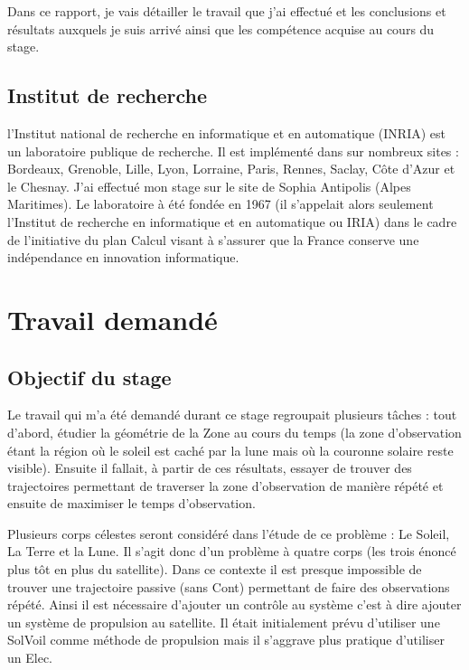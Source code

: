 \documentclass[12pt]{article} %
\begin{document}
		Dans ce rapport, je vais détailler le travail que j'ai effectué et les conclusions et résultats auxquels je suis arrivé ainsi que les compétence acquise au cours du stage. 
		 
		\subsection{Institut de recherche}
		
		l'Institut national de recherche en informatique et en automatique (INRIA) est un laboratoire publique de recherche. Il est implémenté dans sur nombreux sites :  Bordeaux, Grenoble, Lille, Lyon, Lorraine, Paris, Rennes, Saclay, Côte d'Azur et le Chesnay. J'ai effectué mon stage sur le site de Sophia Antipolis (Alpes Maritimes). Le laboratoire à été fondée en 1967 (il s'appelait alors seulement l'Institut de recherche en informatique et en automatique ou IRIA) dans le cadre de l'initiative du plan Calcul visant à s'assurer que la France conserve une indépendance en innovation informatique.
		
		
		\section{Travail demandé}
		\subsection{Objectif du stage}
		Le travail qui m'a été demandé durant ce stage regroupait plusieurs tâches : tout d'abord, étudier la géométrie de la \gls{Zone} au cours du temps (la zone d'observation étant la région où le soleil est caché par la lune mais où la couronne solaire reste visible). Ensuite il fallait, à partir de ces résultats, essayer de trouver des trajectoires permettant de traverser la zone d'observation de manière répété et ensuite de maximiser le temps d'observation.
		
		Plusieurs corps célestes seront considéré dans l'étude de ce problème : Le Soleil, La Terre et la Lune. Il s'agit donc d'un problème à quatre corps (les trois énoncé plus tôt en plus du satellite). Dans ce contexte il est presque impossible de trouver une trajectoire passive (sans \gls{Cont}) permettant de faire des observations répété. Ainsi il est nécessaire d'ajouter un contrôle au système c'est à dire ajouter un système de propulsion au satellite. Il était initialement prévu d'utiliser une \gls{SolVoil} comme méthode de propulsion mais il s'aggrave plus pratique d'utiliser un \gls{Elec}.
			
\end{document}
